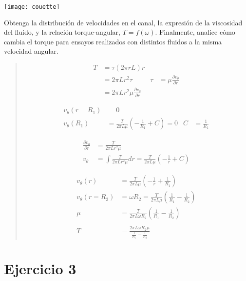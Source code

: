\documentclass[a4paper,10pt,twoside,final,spanish]{article}
\begin{document}
\begin{center}
\texttt{[image: couette]}
\end{center}

Obtenga la distribución de velocidades en el canal, la expresión de la viscosidad del 
fluido, y la relación torque-angular, $T=f(\omega)$. Finalmente, analice cómo cambia  el torque para ensayos realizados con distintos fluidos a la misma velocidad angular. 

\dotfill

\begin{quote}

\begin{align*}
T &= \tau (2\pi rL)r \\
&= 2\pi Lr^{2}\tau & \tau &= \mu\frac{\partial v_{\theta}}{\partial r} \\
&= 2\pi Lr^{2}\mu\frac{\partial v_{\theta}}{\partial r}
\end{align*}

\begin{align*}
v_{\theta}(r=R_{1}) &= 0 \\
v_{\theta}(R_{1}) &= \frac{T}{2\pi L\mu}\left(-\frac{1}{R_{1}}+C\right)=0
& C &= \frac{1}{R_{1}}
\end{align*}

\begin{align*}
\frac{\partial v_{\theta}}{\partial r} &= \frac{T}{2\pi L r^{2}\mu} \\
v_{\theta} &= \int\frac{T}{2\pi L r^{2}\mu}dr
=\frac{T}{2\pi L\mu}\left(-\frac{1}{r}+C\right)
\end{align*}

\begin{align*}
v_{\theta}(r) &= \frac{T}{2\pi L\mu}\left(-\frac{1}{r}+\frac{1}{R_{1}}\right) \\
v_{\theta}(r=R_{2}) &= \omega R_{2}
=\frac{T}{2\pi L\mu}\left(\frac{1}{R_{1}}-\frac{1}{R_{2}}\right) \\
\mu &= \frac{T}{2\pi L\omega R_{2}}\left(\frac{1}{R_{1}}-\frac{1}{R_{2}}\right) \\ \\
T &= \frac{2\pi L\omega R_{2}\mu}{\frac{1}{R_{1}}-\frac{1}{R_{2}}}
\end{align*}

\end{quote}

\section*{Ejercicio 3}
\end{document}
